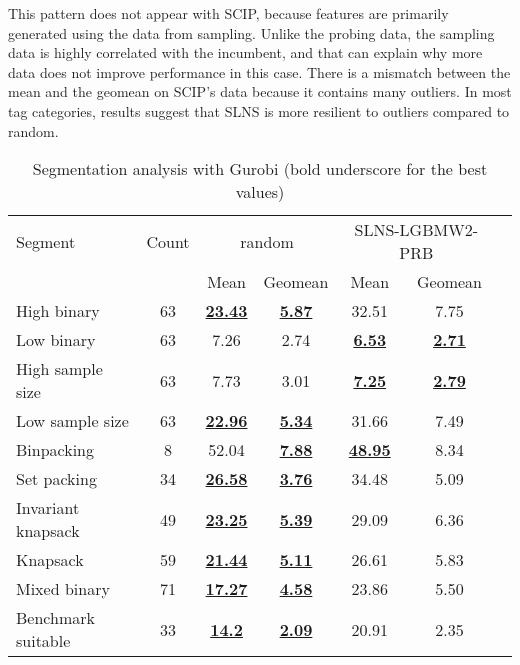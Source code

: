 \documentclass[3p, authoryear, times]{elsarticle}
\begin{document}
This pattern does not appear with SCIP, because features are primarily generated using the data from sampling. Unlike the probing data, the sampling data is highly correlated with the incumbent, and that can explain why more data does not improve performance in this case. There is a mismatch between the mean and the geomean on SCIP's data because it contains many outliers. In most tag categories, results suggest that SLNS is more resilient to outliers compared to random. 

\begin{table}[h]
\centering
\caption{Segmentation analysis with Gurobi (bold underscore for the best values)}
\label{tab:segmentation_grb}
\begin{tabular}{lcccccc}
\toprule
{Segment} & {Count} & \multicolumn{2}{c}{random} & \multicolumn{2}{c}{SLNS-LGBMW2-PRB} \\
{} & {} & {Mean} & {Geomean} & {Mean} & {Geomean} \\
\midrule
High binary & 63 & \underline{\textbf{23.43}} & \underline{\textbf{5.87}} & 32.51 & 7.75 \\
Low binary & 63 & 7.26 & 2.74 & \underline{\textbf{6.53}} & \underline{\textbf{2.71}} \\
High sample size & 63 & 7.73 & 3.01 & \underline{\textbf{7.25}} & \underline{\textbf{2.79}} \\
Low sample size & 63 & \underline{\textbf{22.96}} & \underline{\textbf{5.34}} & 31.66 & 7.49 \\
Binpacking & 8 & 52.04 & \underline{\textbf{7.88}} & \underline{\textbf{48.95}} & 8.34 \\
Set packing & 34 & \underline{\textbf{26.58}} & \underline{\textbf{3.76}} & 34.48 & 5.09 \\
Invariant knapsack & 49 & \underline{\textbf{23.25}} & \underline{\textbf{5.39}} & 29.09 & 6.36 \\
Knapsack & 59 & \underline{\textbf{21.44}} & \underline{\textbf{5.11}} & 26.61 & 5.83 \\
Mixed binary & 71 & \underline{\textbf{17.27}} & \underline{\textbf{4.58}} & 23.86 & 5.50 \\
Benchmark suitable & 33 & \underline{\textbf{14.2}} & \underline{\textbf{2.09}} & 20.91 & 2.35 \\
\bottomrule
\end{tabular}
\end{table}
\end{document}
